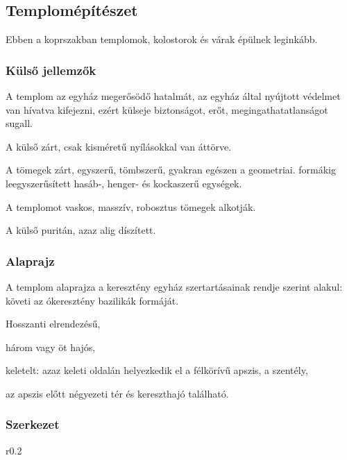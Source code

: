 		
	\subsection*{Templomépítészet}
	
	Ebben a koprszakban templomok, kolostorok és várak épülnek leginkább.
	
	\subsubsection{Külső jellemzők}
	
	A templom az egyház megerősödő hatalmát, az egyház által nyújtott védelmet van hívatva kifejezni, ezért külseje biztonságot, erőt, megingathatatlanságot sugall.
	\begin{compactitem}
		\item A külső zárt, csak kisméretű nyílásokkal van áttörve.
		\item A tömegek zárt, egyszerű, tömbszerű, gyakran egészen a geometriai.
		formákig leegyszerűsített hasáb-, henger- és kockaszerű egységek.
		\item A templomot vaskos, masszív, robosztus tömegek alkotják.
		\item A külső puritán, azaz alig díszített.
	\end{compactitem}

	\subsubsection{Alaprajz}
	
	A templom alaprajza a keresztény egyház szertartásainak rendje szerint alakul: követi az ókeresztény bazilikák formáját.
	\begin{compactitem}
		\item Hosszanti elrendezésű,
		\item három vagy öt hajós,
		\item keletelt: azaz keleti oldalán helyezkedik el a félkörívű apszis, a szentély,
		\item az apszis előtt négyezeti tér és kereszthajó található.
	\end{compactitem}

	\subsubsection{Szerkezet}
	
	\begin{wrapfigure}{r}{0.2\textwidth}
	\end{wrapfigure}
	
